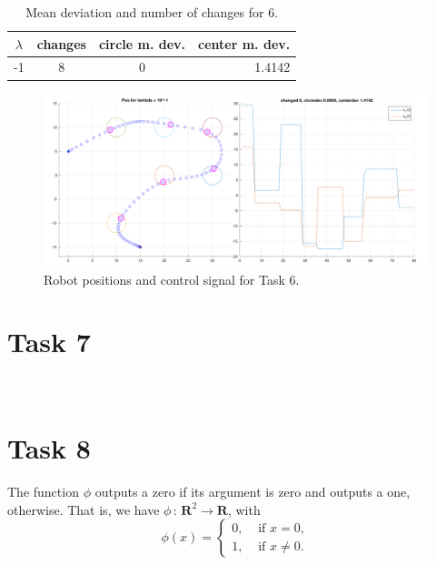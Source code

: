\documentclass[12pt]{article}
\begin{document}
\begin{table}[!htb]
    \centering
    \caption{Mean deviation and number of changes for 6.}
    \begin{tabular}{c|ccr}
    $\lambda$ & changes & circle m. dev. & center m. dev. \\
    \hline
    -1 & 8 & 0 & 1.4142
    \end{tabular}
\end{table}

\begin{figure}[!htb]
    \caption{Robot positions and control signal for Task 6.}
    \label{fig:task6:graph}
    \centering    
    \includegraphics[width=1\linewidth]{part1/figures/task6.pdf}
\end{figure}

\section{Task 7}
\noindent{}\\

\section{Task 8}
The function $\phi$ outputs a zero if its argument is zero and outputs a one, otherwise. That is, we have $\phi\,:\,{\mathbf R}^2 \rightarrow {\mathbf R}$, with $$\phi(x) = \left\{ \begin{array}{ll} 0,  & \text{ if } x = 0, \\ 1, & \text{ if }x \neq 0. \end{array} \right.$$

\noindent{}\\
\end{document}
